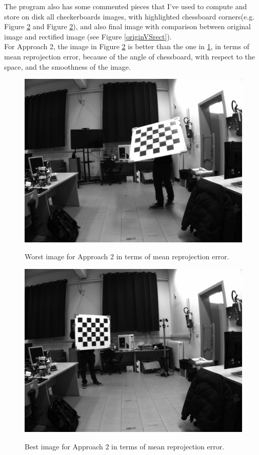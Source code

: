 \documentclass{article}
\begin{document}
\vspace{6cm}
The program also has some commented pieces that I've used to compute and store on disk all checkerboards images, with highlighted chessboard corners(e.g. Figure \ref{chess::best} and Figure \ref{chess::best}), and also final image with comparison between original image and rectified image (see Figure \ref{originVSrect}).\\
For Approach 2, the image in Figure \ref{chess::best} is better than the one in \ref{chess::worst}, in terms of mean reprojection error, because of the angle of chessboard, with respect to the space, and the smoothness of the image.\\
\begin{figure}[h]
\begin{center}
  \includegraphics[scale=0.17]{chessboard44}\\ 
  \caption{\footnotesize{Worst image for Approach 2 in terms of mean reprojection error.}}\label{chess::worst} 
\end{center} 
\end{figure}
\begin{figure}[h]
\begin{center} 
  \includegraphics[scale=0.17]{chessboard38}\\ 
  \caption{\footnotesize{Best image for Approach 2 in terms of mean reprojection error.}}
  \label{chess::best} 
\end{center} 
\end{figure}
\end{document}
